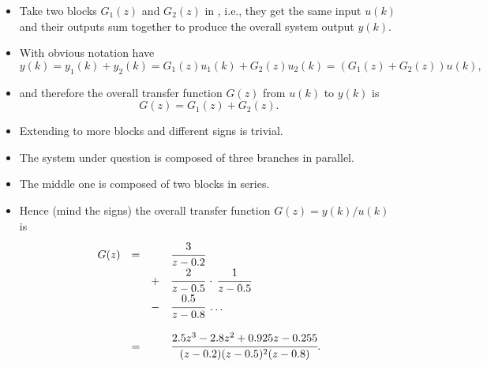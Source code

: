 \begin{frame}
\myPause
 \begin{itemize}[<+-| alert@+>]
 \item Take two blocks $G_1(z)$ and $G_2(z)$ in , i.e., they get the same input $u(k)$
       and their outputs sum together to produce the overall system output $y(k)$.
 \item With obvious notation have
       \begin{displaymath}
        y(k) = y_1(k)+y_2(k) = G_1(z)u_1(k)+G_2(z)u_2(k) = (G_1(z)+G_2(z))u(k),
       \end{displaymath}
 \item and therefore the overall transfer function $G(z)$ from $u(k)$ to $y(k)$ is
       \begin{displaymath}
        G(z) = G_1(z)+G_2(z).
       \end{displaymath}
 \item Extending to more blocks and different signs is trivial.
 \end{itemize}
\end{frame}

\begin{frame}
\myPause
 \begin{itemize}[<+-| alert@+>]
 \item The system under question is composed of three branches in parallel.
 \item The middle one is composed of two blocks in series.
 \item Hence (mind the signs) the overall transfer function $G(z)=y(k)/u(k)$ is
       \begin{displaymath}
        \begin{array}{rcll}
         G(z) &=& & \cfrac{3}{z-0.2}\\
              & &+& \cfrac{2}{z-0.5} \,\cdot\,
                    \cfrac{1}{z-0.5}\\
              & &-& \cfrac{0.5}{z-0.8} \; \ldots\\ \\
              &=& & \cfrac{2.5z^3-2.8z^2+0.925z-0.255}{(z-0.2)(z-0.5)^2(z-0.8)}.
        \end{array}
       \end{displaymath}
 \end{itemize}
\end{frame}

